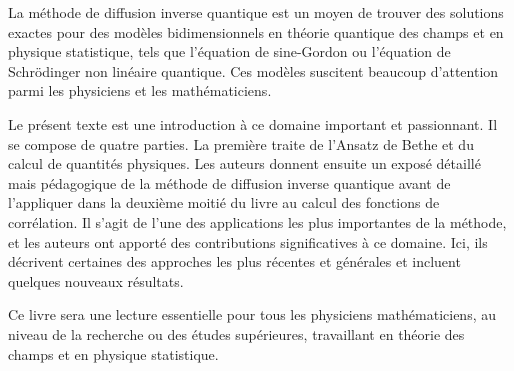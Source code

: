 La méthode de diffusion inverse quantique est un moyen de trouver des solutions exactes pour des modèles bidimensionnels en théorie quantique des champs et en physique statistique, tels que l'équation de sine-Gordon ou l'équation de Schrödinger non linéaire quantique. Ces modèles suscitent beaucoup d'attention parmi les physiciens et les mathématiciens.

Le présent texte est une introduction à ce domaine important et passionnant. Il se compose de quatre parties. La première traite de l'Ansatz de Bethe et du calcul de quantités physiques. Les auteurs donnent ensuite un exposé détaillé mais pédagogique de la méthode de diffusion inverse quantique avant de l'appliquer dans la deuxième moitié du livre au calcul des fonctions de corrélation. Il s'agit de l'une des applications les plus importantes de la méthode, et les auteurs ont apporté des contributions significatives à ce domaine. Ici, ils décrivent certaines des approches les plus récentes et générales et incluent quelques nouveaux résultats.

Ce livre sera une lecture essentielle pour tous les physiciens mathématiciens, au niveau de la recherche ou des études supérieures, travaillant en théorie des champs et en physique statistique.
